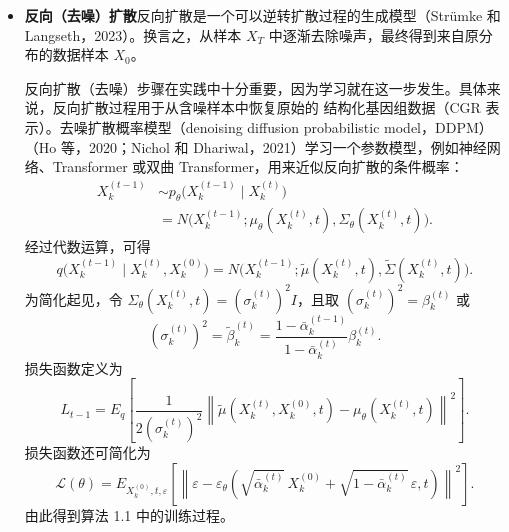 \begin{itemize}
  \item \textbf{反向（去噪）扩散}\quad 反向扩散是一个可以逆转扩散过程的生成模型（Strümke 和 Langseth，2023）。换言之，从样本 $X_T$ 中逐渐去除噪声，最终得到来自原分布的数据样本 $X_0$。

  反向扩散（去噪）步骤在实践中十分重要，因为学习就在这一步发生。具体来说，反向扩散过程用于从含噪样本中恢复原始的
  结构化基因组数据（CGR 表示）。去噪扩散概率模型（denoising diffusion probabilistic model，DDPM）（Ho 等，2020；Nichol 和 Dhariwal，2021）学习一个参数模型，例如神经网络、Transformer 或双曲 Transformer，用来近似反向扩散的条件概率：
  \begin{equation*}
    \begin{aligned}
      X_k^{(t-1)} &\sim p_\theta\bigl(X_k^{(t-1)}\mid X_k^{(t)}\bigr)\\
      &=N\bigl(X_k^{(t-1)};
        \mu_\theta(X_k^{(t)},t),\Sigma_\theta(X_k^{(t)},t)\bigr).
    \end{aligned}
    \tag{1.4}\label{eq:1.4}
  \end{equation*}
  经过代数运算，可得
  \begin{equation*}
    q\bigl(X_k^{(t-1)}\mid X_k^{(t)},X_k^{(0)}\bigr)
      =N\bigl(X_k^{(t-1)};\tilde\mu(X_k^{(t)},t),\tilde\Sigma(X_k^{(t)},t)\bigr).
    \tag{1.5}\label{eq:1.5}
  \end{equation*}
  为简化起见，令 $\Sigma_\theta(X_k^{(t)},t)=(\sigma_k^{(t)})^2I$，且取
  $(\sigma_k^{(t)})^2=\beta_k^{(t)}$ 或
  \[
    (\sigma_k^{(t)})^2=\tilde\beta_k^{(t)}
      =\frac{1-\bar\alpha_k^{(t-1)}}{1-\bar\alpha_k^{(t)}}\beta_k^{(t)}.
  \]
  损失函数定义为
  \begin{equation*}
    L_{t-1}
      =E_q\left[
        \frac{1}{2(\sigma_k^{(t)})^2}
        \left\lVert\tilde\mu(X_k^{(t)},X_k^{(0)},t)
                  -\mu_\theta(X_k^{(t)},t)\right\rVert^2
      \right].
    \tag{1.6}\label{eq:1.6}
  \end{equation*}
  损失函数还可简化为
  \begin{equation*}
    \mathcal L(\theta)
      =E_{X_k^{(0)},t,\varepsilon}\left[
        \left\lVert
          \varepsilon-\varepsilon_\theta\left(
            \sqrt{\bar\alpha_k^{(t)}}\,X_k^{(0)}
            +\sqrt{1-\bar\alpha_k^{(t)}}\,\varepsilon,t
          \right)
        \right\rVert^2
      \right].
    \tag{1.7}\label{eq:1.7}
  \end{equation*}
  由此得到算法 1.1 中的训练过程。
\end{itemize}

